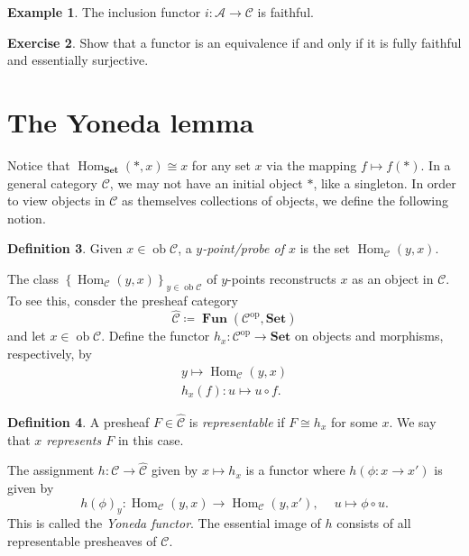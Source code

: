 \documentclass[10pt,letterpaper,cm]{nupset}
\theoremstyle{definition}
\newtheorem{definition}{Definition}[subsection]
\newtheorem{exmp}[definition]{Example}
\theoremstyle{theorem}
\newtheorem{exercise}[definition]{Exercise}
\theoremstyle{remark}
\newcommand{\1}{\mathbf{1}}
\renewcommand{\a}{\mathscr{A}}
\renewcommand{\c}{\mathscr{C}}
\newcommand{\0}{\vec 0}
\DeclareMathOperator{\op}{op}
\DeclareMathOperator{\ob}{ob}
\DeclareMathOperator{\Hom}{Hom}
\DeclareMathOperator{\Fun}{\mathbf{Fun}}
\begin{document}
\begin{exmp}
The inclusion functor $i : \a \to \c$ is faithful.
\end{exmp}

\smallskip


\begin{exercise}
Show that a functor is an equivalence if and only if it is fully faithful and essentially surjective.
\end{exercise}



\section{The Yoneda lemma}

Notice that $\Hom_{\mathbf{Set}}(\ast, x) \cong x$ for any set $x$ via the mapping $f \mapsto f(\ast)$. In a general category $\c$, we may not have an initial object $\ast$, like a singleton. In order to view objects in $\c$ as themselves collections of objects, we define the following notion.

\begin{definition}
Given $x \in \ob \c$, a \textit{$y$-point/probe of $x$} is the set $\Hom_{\c}(y, x)$.
\end{definition}
The class $\left\{\Hom_{\c}(y, x)\right\}_{y\in \ob \c}$ of $y$-points reconstructs $x$ as an object in $\c$. To see this, consder the presheaf category $$\widehat{\c}\coloneqq  \Fun(\c^{\op}, \mathbf{Set})$$ and let $x \in \ob \c$. Define the functor $h_x : \c^{\op} \to \mathbf{Set}$ on objects and morphisms, respectively, by 
\begin{gather*}
y \mapsto \Hom_{\c}(y, x)
\\ h_x(f) : u \mapsto u \circ f.
\end{gather*}

\begin{definition}
A presheaf $F \in \widehat{\c}$ is \textit{representable} if $F \cong h_x$ for some $x$. We say that \textit{$x$ represents $F$} in this case.
\end{definition}
The assignment $h: \c \to \widehat{\c}$ given by $x \mapsto h_x$ is a functor where $h(\phi : x \to x')$ is given by $$h(\phi)_y : \Hom_{\c}(y, x) \to \Hom_{\c}(y, x'),\ \quad u \mapsto \phi \circ u.$$ This is called the \textit{Yoneda functor}. The essential image of $h$ consists of all representable presheaves of $\c$.
\end{document}
